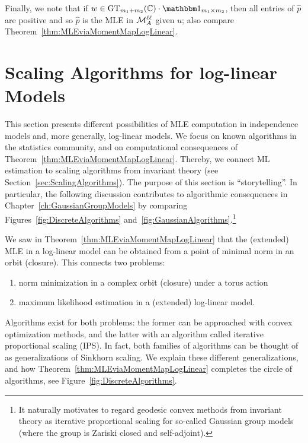 \begin{example}
	Finally, we note that if $w \in \GT_{m_1 + m_2}(\CC) \cdot \ones_{m_1 \times m_2}$, then all entries of $\hat{p}$ are positive and so $\hat{p}$ is the MLE in $\mathcal{M}^{\mathtt{\ell \ell}}_A$ given $u$; also compare Theorem~\ref{thm:MLEviaMomentMapLogLinear}.
	\hfill\exSymbol
\end{example}






\section{Scaling Algorithms for log-linear Models}\label{sec:ScalingLogLinear}


This section presents different possibilities of MLE computation in independence models and, more generally, log-linear models. We focus on known algorithms in the statistics community, and on computational consequences of Theorem~\ref{thm:MLEviaMomentMapLogLinear}.
Thereby, we connect ML estimation to scaling algorithms from invariant theory (see Section~\ref{sec:ScalingAlgorithms}). The purpose of this section is ``storytelling''.
In particular, the following discussion contributes to algorithmic consequences in Chapter~\ref{ch:GaussianGroupModels} by comparing Figures~\ref{fig:DiscreteAlgorithms} and~\ref{fig:GaussianAlgorithms}.\footnote{It naturally motivates to regard geodesic convex methods from invariant theory as iterative proportional scaling for so-called Gaussian group models (where the group is Zariski closed and self-adjoint).}

We saw in Theorem~\ref{thm:MLEviaMomentMapLogLinear} that the (extended) MLE in a log-linear model can be obtained from a point of minimal norm in an orbit (closure).
This connects two problems:
\begin{enumerate}
	\item norm minimization in a complex orbit (closure) under a torus action
	\item maximum likelihood estimation in a (extended) log-linear model.
\end{enumerate}

Algorithms exist for both problems: the former can be approached with convex optimization methods, and the latter with an algorithm called iterative proportional scaling (IPS). In fact, both families of algorithms can be thought of as generalizations of Sinkhorn scaling. 
We explain these different generalizations, and how Theorem~\ref{thm:MLEviaMomentMapLogLinear} completes the circle of algorithms, see Figure~\ref{fig:DiscreteAlgorithms}.

